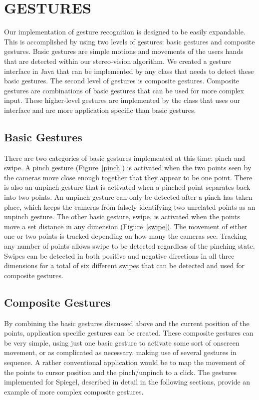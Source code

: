 \documentclass[a4paper,twoside]{article}
\begin{document}
\section{\uppercase{Gestures}} Our implementation of gesture recognition is
designed to be easily expandable. This is accomplished by using two levels of
gestures: basic gestures and composite gestures. Basic gestures are simple
motions and movements of the users hands that are detected within our
stereo-vision algorithm. We created a gesture interface in Java that can be
implemented by any class that needs to detect these basic gestures. The second
level of gestures is composite gestures. Composite gestures are combinations of
basic gestures that can be used for more complex input. These higher-level
gestures are implemented by the class that uses our interface and are more
application specific than basic gestures.  \subsection{Basic Gestures} There
are two categories of basic gestures implemented at this time: pinch and swipe.
A pinch gesture (Figure~\ref{pinch}) is activated when the two points seen by
the cameras move close enough together that they appear to be one point. There
is also an unpinch gesture that is activated when a pinched point separates
back into two points. An unpinch gesture can only be detected after a pinch has
taken place, which keeps the cameras from falsely identifying two unrelated
points as an unpinch gesture. The other basic gesture, swipe, is activated when
the points move a set distance in any dimension (Figure~\ref{swipe}). The
movement of either one or two points is tracked depending on how many the
cameras see. Tracking any number of points allows swipe to be detected
regardless of the pinching state. Swipes can be detected in both positive and
negative directions in all three dimensions for a total of six different swipes
that can be detected and used for composite gestures.

\subsection{Composite Gestures} By combining the basic gestures discussed above
and the current position of the points, application specific gestures can be
created. These composite gestures can be very simple, using just one basic
gesture to activate some sort of onscreen movement, or as complicated as
necessary, making use of several gestures in sequence. A rather conventional
application would be to map the movement of the points to cursor position and
the pinch/unpinch to a click.  The gestures implemented for Spiegel, described
in detail in the following sections, provide an example of more complex
composite gestures. 
\end{document}
